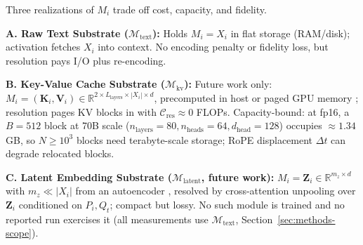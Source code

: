 \documentclass[runningheads]{llncs}
\begin{document}
{\small
Three realizations of $M_i$ trade off cost, capacity, and fidelity.

\noindent\textbf{A. Raw Text Substrate ($\mathcal{M}_{\text{text}}$):}
Holds $M_i = X_i$ in flat storage (RAM/disk); activation fetches $X_i$ into context. No encoding penalty or fidelity loss, but resolution pays I/O plus re-encoding.

\noindent\textbf{B. Key-Value Cache Substrate ($\mathcal{M}_{\text{kv}}$):}
Future work only: $M_i = (\mathbf{K}_i, \mathbf{V}_i) \in \mathbb{R}^{2 \times L_{\text{layers}} \times |X_i| \times d}$, precomputed in host or paged GPU memory \cite{kwon2023pagedattention}; resolution pages KV blocks in with $\mathcal{C}_{\mathrm{res}} \approx 0$ FLOPs. Capacity-bound: at fp16, a $B{=}512$ block at 70B scale ($n_{\mathrm{layers}}{=}80, n_{\mathrm{heads}}{=}64, d_{\mathrm{head}}{=}128$) occupies $\approx 1.34$\,GB, so $N \ge 10^3$ blocks need terabyte-scale storage; RoPE displacement $\Delta t$ can degrade relocated blocks.

\noindent\textbf{C. Latent Embedding Substrate ($\mathcal{M}_{\text{latent}}$, future work):}
$M_i = \mathbf{Z}_i \in \mathbb{R}^{m_z \times d}$ with $m_z \ll |X_i|$ from an autoencoder \cite{ge2024icae}, resolved by cross-attention unpooling over $\mathbf{Z}_i$ conditioned on $P_i, Q_t$; compact but lossy. No such module is trained and no reported run exercises it (all measurements use $\mathcal{M}_{\text{text}}$, Section~\ref{sec:methods-scope}).

}
\end{document}
